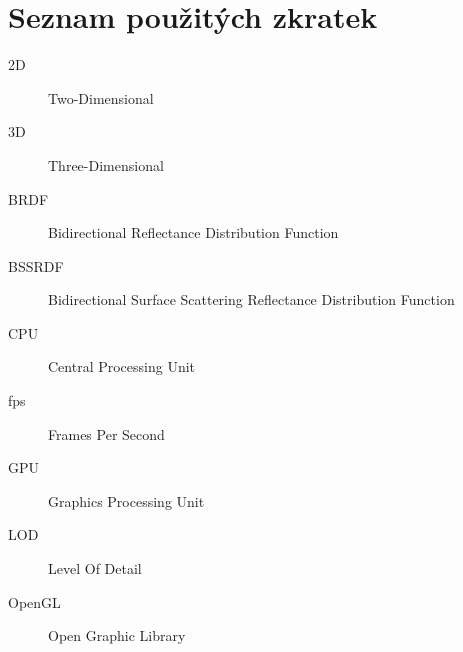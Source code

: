 \documentclass[11pt,twoside,a4paper]{book}
\begin{document}


%
{
\def\CS{$\cal C\kern-0.1667em\lower.5ex\hbox{$\cal S$}\kern-0.075em $}

 }

%


\listoffigures



\listoftables



\appendix

\chapter{Seznam použitých zkratek}

\begin{description}
\item[2D] 		Two-Dimensional
\item[3D] 		Three-Dimensional
\item[BRDF] 	Bidirectional Reflectance Distribution Function
\item[BSSRDF] 	Bidirectional Surface Scattering Reflectance Distribution Function
\item[CPU] 		Central Processing Unit
\item[fps] 		Frames Per Second
\item[GPU] 		Graphics Processing Unit
\item[LOD]		Level Of Detail
\item[OpenGL] 	Open Graphic Library

\end{description}

\end{document}
